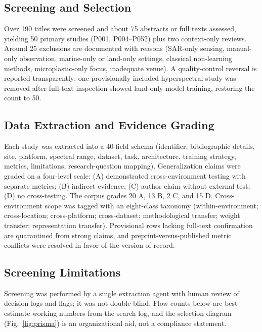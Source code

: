 \subsection{Screening and Selection}
Over 190 titles were screened and about 75 abstracts or full texts assessed, yielding 50 primary studies (P001, P004--P052) plus two context-only reviews. Around 25 exclusions are documented with reasons (SAR-only sensing, manual-only observation, marine-only or land-only settings, classical non-learning methods, microplastic-only focus, inadequate venue). A quality-control reversal is reported transparently: one provisionally included hyperspectral study was removed after full-text inspection showed land-only model training, restoring the count to 50.

\subsection{Data Extraction and Evidence Grading}
Each study was extracted into a 40-field schema (identifier, bibliographic details, site, platform, spectral range, dataset, task, architecture, training strategy, metrics, limitations, research-question mapping). Generalization claims were graded on a four-level scale: (A) demonstrated cross-environment testing with separate metrics; (B) indirect evidence; (C) author claim without external test; (D) no cross-testing. The corpus grades 20 A, 13 B, 2 C, and 15 D. Cross-environment scope was tagged with an eight-class taxonomy (within-environment; cross-location; cross-platform; cross-dataset; methodological transfer; weight transfer; representation transfer). Provisional rows lacking full-text confirmation are quarantined from strong claims, and preprint-versus-published metric conflicts were resolved in favor of the version of record.

\subsection{Screening Limitations}
Screening was performed by a single extraction agent with human review of decision logs and flags; it was not double-blind. Flow counts below are best-estimate working numbers from the search log, and the selection diagram (Fig.~\ref{fig:prisma}) is an organizational aid, not a compliance statement.

